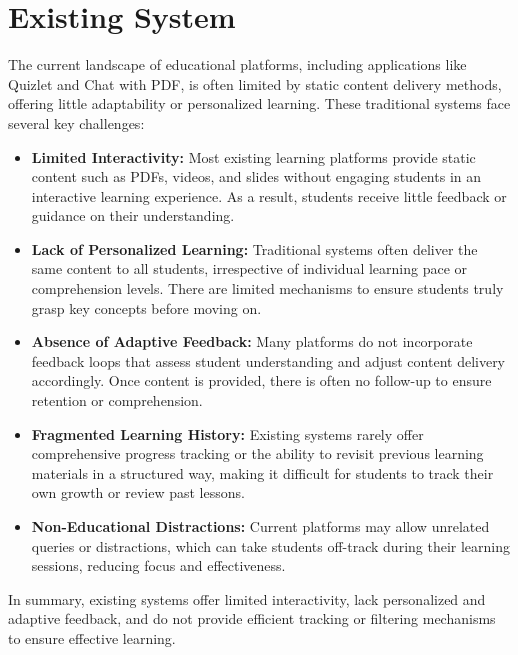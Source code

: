 \documentclass{report}
\begin{document}
\section{Existing System}
The current landscape of educational platforms, including applications like Quizlet and Chat with PDF, is often limited by static content delivery methods, offering little adaptability or personalized learning. These traditional systems face several key challenges:
\begin{itemize}
    \item \textbf{Limited Interactivity:} Most existing learning platforms provide static content such as PDFs, videos, and slides without engaging students in an interactive learning experience. As a result, students receive little feedback or guidance on their understanding.
    \item \textbf{Lack of Personalized Learning:} Traditional systems often deliver the same content to all students, irrespective of individual learning pace or comprehension levels. There are limited mechanisms to ensure students truly grasp key concepts before moving on.
    \item \textbf{Absence of Adaptive Feedback:} Many platforms do not incorporate feedback loops that assess student understanding and adjust content delivery accordingly. Once content is provided, there is often no follow-up to ensure retention or comprehension.
    \item \textbf{Fragmented Learning History:} Existing systems rarely offer comprehensive progress tracking or the ability to revisit previous learning materials in a structured way, making it difficult for students to track their own growth or review past lessons.
    \item \textbf{Non-Educational Distractions:} Current platforms may allow unrelated queries or distractions, which can take students off-track during their learning sessions, reducing focus and effectiveness.
\end{itemize}
In summary, existing systems offer limited interactivity, lack personalized and adaptive feedback, and do not provide efficient tracking or filtering mechanisms to ensure effective learning.
\end{document}
